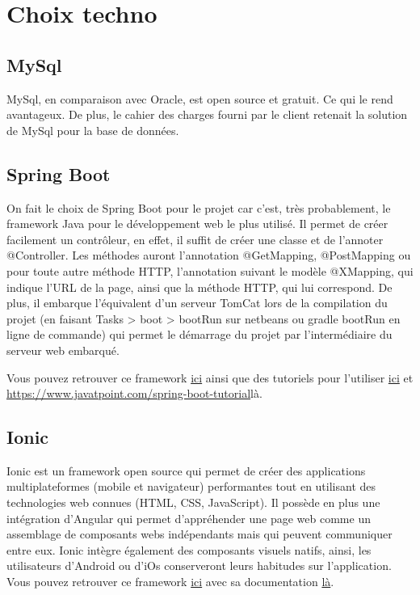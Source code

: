	\section{Choix techno}

		\subsection{MySql}

			MySql, en comparaison avec Oracle, est open source et gratuit. Ce qui le rend avantageux. \newline
			De plus, le cahier des charges fourni par le client retenait la solution de MySql pour la base de données.

		\subsection{Spring Boot}

			On fait le choix de Spring Boot pour le projet car c'est, très probablement, le framework Java pour le développement web le plus utilisé. \newline
			Il permet de créer facilement un contrôleur, en effet, il suffit de créer une classe et de l’annoter @Controller. Les méthodes auront l’annotation @GetMapping, @PostMapping ou pour toute autre méthode HTTP, l'annotation suivant le modèle @XMapping, qui indique l'URL de la page, ainsi que la méthode HTTP, qui lui correspond.\newline
			De plus, il embarque l'équivalent d'un serveur TomCat lors de la compilation du projet (en faisant Tasks > boot > bootRun sur netbeans ou gradle bootRun en ligne de commande) qui permet le démarrage du projet par l'intermédiaire du serveur web embarqué. \newline

			\noindent
			Vous pouvez retrouver ce framework \href{https://spring.io/projects/spring-boot}{ici} ainsi que des tutoriels pour l'utiliser \href{https://www.tutorialspoint.com/spring_boot/index.htm}{ici} et \url{https://www.javatpoint.com/spring-boot-tutorial}{là}.

		\subsection{Ionic}

			Ionic est un framework open source qui permet de créer des applications multiplateformes (mobile et navigateur) performantes tout en utilisant des technologies web connues (HTML, CSS, JavaScript). Il possède en plus une intégration d'Angular qui permet d'appréhender une page web comme un assemblage de composants webs indépendants mais qui peuvent communiquer entre eux. \newline
			Ionic intègre également des composants visuels natifs, ainsi, les utilisateurs d'Android ou d'iOs conserveront leurs habitudes sur l'application. \newline
			Vous pouvez retrouver ce framework \href{https://ionicframework.com/docs/installation/cli}{ici} avec sa documentation \href{https://ionicframework.com/docs/components}{là}.

